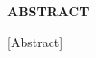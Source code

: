 \newenvironment{abstract}%
    {\thispagestyle{empty}\null\vfill\begin{center}%
    \bfseries ABSTRACT\end{center}}%
    {~\vfill}
        \begin{abstract}
   		[Abstract]
   		
        \end{abstract}